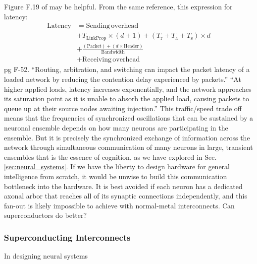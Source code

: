 \vspace{3em}
Figure F.19 of \cite{hepa2012} may be helpful. From the same reference, this expression for latency:
\begin{equation}
\label{eq:switching_network_latency}
\begin{split}
\mathrm{Latency} & = \mathrm{Sending}\,\mathrm{overhead} \\
&+T_{\mathrm{LinkProp}}\times(d+1)+(T_{\mathrm{r}}+T_{\mathrm{a}}+T_{\mathrm{s}})\times d \\
&+\frac{(\mathrm{Packet})+(d\times\mathrm{Header})}{\mathrm{Bandwidth}} \\
&+\mathrm{Receiving}\,\mathrm{overhead}
\end{split}
\end{equation}
pg F-52.
``Routing, arbitration, and switching can impact the packet latency of a loaded network by reducing the contention delay experienced by packets.'' \cite{hepa2012}
``At higher applied loads, latency increases exponentially, and the network approaches its saturation point as it is unable to absorb the applied load, causing packets to queue up at their source nodes awaiting injection.'' \cite{hepa2012}
This traffic/speed trade off means that the frequencies of synchronized oscillations that can be sustained by a neuronal ensemble depends on how many neurons are participating in the ensemble. But it is precisely the synchronized exchange of information across the network through simultaneous communication of many neurons in large, transient ensembles that is the essence of cognition, as we have explored in Sec.\,\ref{sec:neural_systems}. If we have the liberty to design hardware for general intelligence from scratch, it would be unwise to build this communication bottleneck into the hardware. It is best avoided if each neuron has a dedicated axonal arbor that reaches all of its synaptic connections independently, and this fan-out is likely impossible to achieve with normal-metal interconnects. Can superconductors do better?

\subsubsection{\label{sec:superconducting_interconnects}Superconducting Interconnects}
In designing neural systems 

